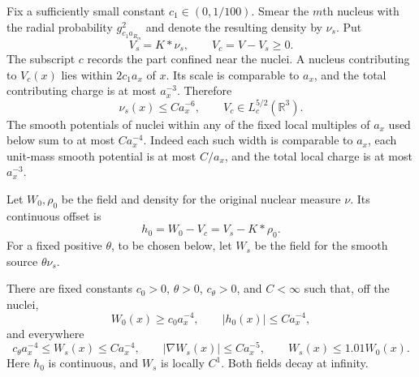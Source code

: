 Fix a sufficiently small constant $c_1\in(0,1/100)$.  Smear the $m$th
nucleus with the radial probability $g_{c_1a_{R_m}}^2$ and denote the
resulting density by $\nu_s$.  Put
\begin{equation}\label{m:eq:nuclear-splitting}
 V_s=K*\nu_s,\qquad V_c=V-V_s\ge0.
\end{equation}
The subscript $c$ records the part confined near the nuclei.  A nucleus
contributing to $V_c(x)$ lies within $2c_1a_x$ of $x$.  Its scale is
comparable to $a_x$, and the total contributing charge is at most
$a_x^{-3}$.  Therefore
\begin{equation}\label{m:eq:smoothed-source-bounds}
 \nu_s(x)\le Ca_x^{-6},\qquad V_c\in L^{5/2}_c(\mathbb R^3).
\end{equation}
The smooth potentials of nuclei within any of the fixed local multiples
of $a_x$ used below sum to at most $Ca_x^{-4}$.  Indeed each such width
is comparable to $a_x$, each unit-mass smooth potential is at most
$C/a_x$, and the total local charge is at most $a_x^{-3}$.

Let $W_0,\rho_0$ be the field and density for the original nuclear measure
$\nu$.  Its continuous offset is
\[
 h_0=W_0-V_c=V_s-K*\rho_0.
\]
For a fixed positive $\theta$, to be chosen below, let $W_s$ be the field
for the smooth source $\theta\nu_s$.

\begin{lemma}\label{m:lem:barrier-fields}
There are fixed constants $c_0>0$, $\theta>0$, $c_\theta>0$, and $C<\infty$
such that, off the nuclei,
\begin{equation}\label{m:eq:reference-field-bounds}
 W_0(x)\ge c_0a_x^{-4},\qquad |h_0(x)|\le Ca_x^{-4},
\end{equation}
and everywhere
\begin{equation}\label{m:eq:smooth-reference-bounds}
 c_\theta a_x^{-4}\le W_s(x)\le Ca_x^{-4},\qquad
 |\nabla W_s(x)|\le Ca_x^{-5},\qquad W_s(x)\le1.01W_0(x).
\end{equation}
Here $h_0$ is continuous, and $W_s$ is locally $C^1$.  Both fields decay
at infinity.
\end{lemma}

